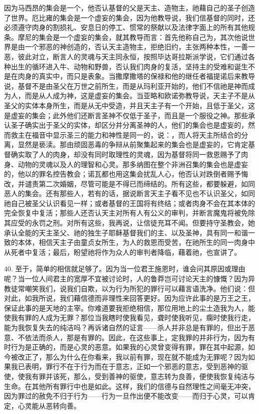 因为马西昂的集会是一个，他否认基督的父是天主、造物主，祂藉自己的圣子创造了世界。厄比雍的集会是一个虚妄的集会，因为他教导说，我们信基督的同时，还必须遵守肉身的割损礼、安息日的停工、惯常的祭献以及法律字面上的所有其他规条。摩尼的集会是一个虚妄的集会，就其教导而言：首先他称自己为，其次他说世界是由一个邪恶的神创造的，否认天主造物主，拒绝旧约，主张两种本性，一善一恶，彼此对立，断言人的灵魂与天主同永恒，按照毕达哥拉斯派学说，它们通过各种出生的循环进入牛、动物和野兽，否认我们肉身的复活，坚持主的受难和诞生不是在肉身的真实中，而只是表象。当撒摩撒塔的保禄和他的继任者福提诺后来教导说，基督不是由圣父在万世之前所生，而是从玛利亚开始的，他们不信祂是神而成为人，而是从人成为神，这是虚妄的集会。当亚略和欧诺弥教导说，天主子不是从圣父的实体本身所生，而是从无中受造，并且天主子有一个开始，且低于圣父，这是虚妄的集会；此外他们还断言圣神不仅低于圣子，而且是一个服役之神。那些承认圣子确实出于圣父的实体，却区分并分离圣神的人，他们的集会也是虚妄的，然而救主在福音中显示圣三的能力和神性是同一的，说：，而人将天主所结合的分离，显然是亵渎。那由顽固恶毒的争辩从前聚集起来的集会也是虚妄的，它肯定基督确实取了人的肉身，却没有同时取理性的灵魂，因为基督将同一救恩赐予了肉身、动物的灵魂以及人的理智和心灵。那多纳图在整个非洲召集的集会也是虚妄的，他以的罪名控告教会；诺瓦都也用这集会扰乱人心，他否认对跌倒者赐予悔改，并谴责第二次婚姻，尽管可能是不得已而缔结的。所有这些，都要躲避，如同恶人的集会。还有那些人，若有的话，据说断言天主子看不见也不认识圣父，如同祂自己被圣父认识看见一样；或者基督的王国将有终结；或者肉身不会在其本体的完全恢复中复活；那些人还否认天主对所有人有公义的审判，并断言魔鬼将被免除其应受的永罚之刑。对所有这些，我再说，让信徒充耳不闻。但要持守圣教会，她承认全能的天主圣父、祂的独生子耶稣基督我们的主、以及圣神，具有同一和谐一致的本体，相信天主子由童贞女所生，为人的救恩而受苦，在祂所生的同一肉身中从死者中复活；最后，盼望祂将作为众人的审判者降临，藉着祂，也宣讲了。\par

40. 至于，简单的相信就足够了。因为当一位君王施恩时，谁会问其原因或理由呢？当一位人间君主的宽厚不宜被讨论时，人的鲁莽岂可讨论天主的慷慨？因为异教徒常嘲笑我们，说我们自欺，以为行为所犯的罪行可以藉言语洗净。他们说：但对此，如我所说，我们藉信德而非理性来回答更好。因为应许此事的是万王之王，保证此事的是天地的主宰。你难道要我拒绝相信，那位用地上的尘土造我为人，能使我有罪的人成为无罪？那位当我瞎时使我看见，聋时使我听见，瘸时使我行走，能为我恢复失去的纯洁吗？再诉诸自然的证言——杀人并非总是有罪的，但出于恶意、不依法而杀人，那是有罪的。因此，在这些事上，定我罪的并非行为，因为有时行为是正确的，而是心灵的恶意。如果我的心灵曾变得有罪，罪在其中起源，如今被改正了，那么为什么在你看来，我以前有罪，现在就不能成为无罪呢？因为如果我已表明，罪行不在于行为而在于意志，正如一个邪恶的意志，受到恶神的驱使，使我有罪并该死，那么，受到善神的驱使，意志转为良善，便使我恢复纯洁与生命。在其他所有罪行中也是如此。这样，我们的信德与自然理性之间毫无冲突，因为罪过的赦免不归于行为——行为一旦作出便不能改变——而归于心灵，可以肯定，心灵能从恶转向善。\par


